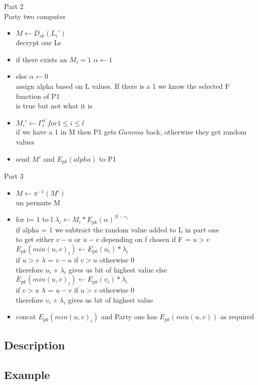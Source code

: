 \documentclass[10pt]{article} %
\begin{document}
Part 2\\
Party two computes
\begin{itemize}
	\item $M \gets D_{sk}(L_i')$
	\\decrypt our Ls
	\item if there exists an $M_i=1$
		\subitem $\alpha \gets 1$
	\item else
		\subitem $\alpha \gets 0$
	\\assign alpha based on L values. If there is a 1 we know the selected F function of P1
	\\is true but not what it is
	\item $M_i' \gets \Gamma_i^{\alpha '} for 1\le i \le l$
	\\if we have a 1 in M then P1 gets $Gamma$ back, otherwise they get random values
	\item send $M'$ and $E_{pk}(alpha)$ to P1
\end{itemize}
Part 3\\
\begin{itemize}
	\item $M \gets \pi^{-1}(M')$
	\\un permute M
	\item for i= 1 to l
		\subitem $\lambda_i \gets M_i * E_{pk}(\alpha)^{N-r_i}$
		\\if alpha = 1 we subtract the random value added to L in part one
		\\to get either $v-u$ or $u-v$ depending on f chosen
		\subitem if F = $u>v$ 
			\subitem $E_{pk}(min(u,v)_i) \gets E_{pk}(u_i) * \lambda_i$
			\\if $u>v$ $\lambda$ = $v-u$ if $v>u$ otherwise 0
			\\therefore $u_i +\lambda_i$ gives us bit of highest value
		\subitem else
			\subitem $E_{pk}(min(u,v)_i) \gets E_{pk}(v_i) * \lambda_i$
			\\if $v>u$ $\lambda$ = $u-v$ if $u>v$ otherwise 0
			\\therefore $v_i +\lambda_i$ gives us bit of highest value
	\item concat $E_{pk}(min(u,v)_i)$ and Party one has $E_{pk}(min(u,v))$ as required
			
\end{itemize}
\subsection*{\textbf{Description}}

\subsection*{\textbf{Example}}
\end{document}
